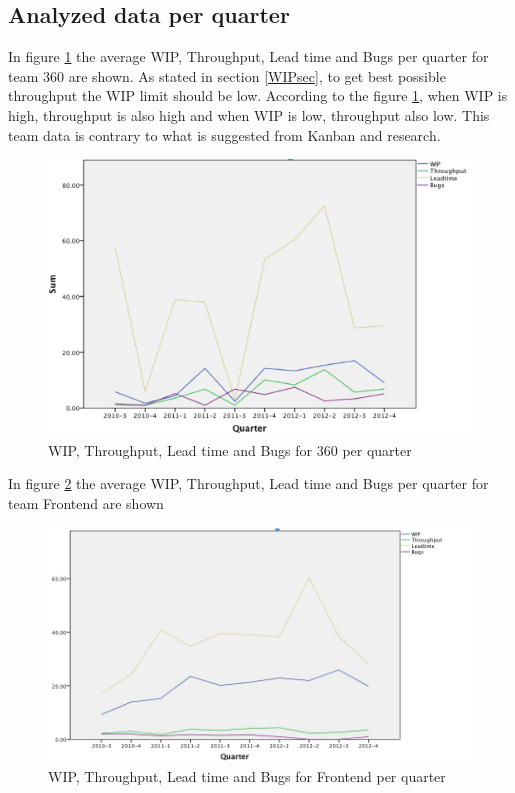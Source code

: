 \documentclass[UKenglish]{ifimaster}  %
\begin{document}
\subsection{Analyzed data per quarter}
In figure \ref{360pq} the average WIP, Throughput, Lead time and Bugs per quarter for team 360 are shown. As stated in section \ref{WIPsec}, to get best possible throughput the WIP limit should be low. According to the figure \ref{360pq}, when WIP is high, throughput is also high and when WIP is low, throughput also low. This team data is contrary to what is suggested from Kanban and research.






\begin{figure}[!htbp]
\centering
\hspace*{-2in}
\includegraphics[scale=0.8]{Picture/360/360_WIP_TP_BUGS_LT.jpg}
\caption{WIP, Throughput, Lead time and Bugs for 360 per quarter}
\label{360pq} %
\end{figure}
\newpage

In figure \ref{Frontendpq} the average WIP, Throughput, Lead time and Bugs per quarter for team Frontend are shown
\begin{figure}[!htbp]
\centering
\hspace*{-1.2in}
\includegraphics[scale=0.7]{Picture/Frontend/Frontend-WIP-TP-LT-BUGS.jpg}
\caption{WIP, Throughput, Lead time and Bugs for Frontend per quarter}
\label{Frontendpq} %
\end{figure}
\newpage
\end{document}
